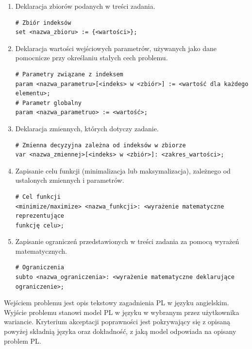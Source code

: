 \begin{enumerate}
\item Deklaracja zbiorów podanych w treści zadania.

\begin{lstlisting}[language=zimpl]
# Zbiór indeksów
set <nazwa_zbioru> := {<wartości>};
\end{lstlisting}

\item Deklaracja wartości wejściowych parametrów, używanych jako dane pomocnicze przy określaniu stałych cech problemu.

\begin{lstlisting}[language=zimpl]
# Parametry związane z indeksem
param <nazwa_parametru>[<indeks> w <zbiór>] := <wartość dla każdego elementu>;
# Parametr globalny
param <nazwa_parametruo> := <wartość>;
\end{lstlisting}

\item Deklaracja zmiennych, których dotyczy zadanie.

\begin{lstlisting}[language=zimpl]
# Zmienna decyzyjna zależna od indeksów w zbiorze
var <nazwa_zmiennej>[<indeks> w <zbiór>]: <zakres_wartości>;
\end{lstlisting}

\item Zapisanie celu funkcji (minimalizacja lub maksymalizacja), zależnego od ustalonych zmiennych i parametrów.

\begin{lstlisting}[language=zimpl]
# Cel funkcji
<minimize/maximize> <nazwa_funkcji>: <wyrażenie matematyczne reprezentujące
funkcję celu>;
\end{lstlisting}

\item Zapisanie ograniczeń przedstawionych w treści zadania za pomocą wyrażeń matematycznych.

\begin{lstlisting}[language=zimpl]
# Ograniczenia
subto <nazwa_ograniczenia>: <wyrażenie matematyczne deklarujące ograniczenie>;
\end{lstlisting}
\end{enumerate}

Wejściem problemu jest opis tekstowy zagadnienia PL w języku angielskim. Wyjście problemu stanowi model PL w języku  w wybranym przez użytkownika wariancie. Kryterium akceptacji poprawności jest pokrywający się z opisaną powyżej składnią języka  oraz dokładność, z jaką model odpowiada na opisany problem PL.

